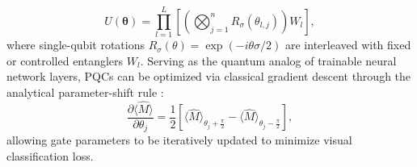 \documentclass[journal]{IEEEtran}
\begin{document}
\begin{equation}
U(\boldsymbol{\theta}) = \prod_{l=1}^L \left[ \left(\bigotimes_{j=1}^n R_{\sigma}(\theta_{l,j})\right) W_l \right],
\label{eq:pqc_general_form}
\end{equation}
where single-qubit rotations $R_{\sigma}(\theta) = \exp(-i\theta\sigma/2)$ are interleaved with fixed or controlled entanglers $W_l$. Serving as the quantum analog of trainable neural network layers, PQCs can be optimized via classical gradient descent through the analytical parameter-shift rule \cite{schuld2019evaluating}:
\begin{equation}
\frac{\partial \langle \hat{M} \rangle}{\partial \theta_j} = \frac{1}{2} \left[ \langle \hat{M} \rangle_{\theta_j + \frac{\pi}{2}} - \langle \hat{M} \rangle_{\theta_j - \frac{\pi}{2}} \right],
\label{eq:parameter_shift_intro}
\end{equation}
allowing gate parameters to be iteratively updated to minimize visual classification loss.
\end{document}
